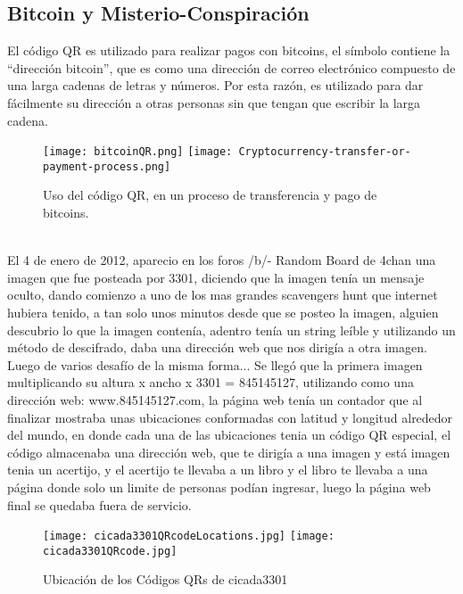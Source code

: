\subsection{Bitcoin y Misterio-Conspiración}

El código QR es utilizado para realizar pagos con bitcoins, el símbolo contiene la ``dirección bitcoin'', que es como una dirección de correo electrónico compuesto de una larga cadenas de letras y números. Por esta razón, es utilizado para dar fácilmente su dirección a otras personas sin que tengan que escribir la larga cadena.\cite{2015_Antonopoulos_BOOK}
\begin{figure} 	
	\centering
	\texttt{[image: bitcoinQR.png]}
	\texttt{[image: Cryptocurrency-transfer-or-payment-process.png]}	
	\caption{Uso del código QR, en un proceso de transferencia y pago de bitcoins.}
	\label{fig:qrbitcoin}
\end{figure}
\\
El 4 de enero de 2012, aparecio en los foros /b/- Random Board de 4chan una imagen que fue posteada por 3301, diciendo que la imagen tenía un mensaje oculto, dando comienzo a uno de los mas grandes scavengers hunt que internet hubiera tenido, a tan solo unos minutos desde que se posteo la imagen, alguien descubrio lo que la imagen contenía, adentro tenía un string leíble  y utilizando un método de descifrado, daba una dirección web que nos dirigía a otra imagen. Luego de varios desafío de la misma forma... Se llegó que la primera imagen multiplicando su altura x ancho x 3301 = 845145127, utilizando como una dirección web: www.845145127.com, la página  web tenía un contador que al finalizar mostraba unas ubicaciones conformadas con latitud y longitud alrededor del mundo, en donde cada una de las ubicaciones tenia un código QR especial, el código almacenaba una dirección web,  que te dirigía a una imagen y está imagen tenia un acertijo, y el acertijo te llevaba a un libro y el libro te llevaba a una página donde solo un limite de personas podían ingresar, luego la página web final se quedaba fuera de servicio. \cite{lemmino2018}
\begin{figure} 	
	\texttt{[image: cicada3301QRcodeLocations.jpg]}
	\texttt{[image: cicada3301QRcode.jpg]}	
	\caption{Ubicación de los Códigos QRs de cicada3301 }
	\label{fig:qrcicada3301}
\end{figure}

